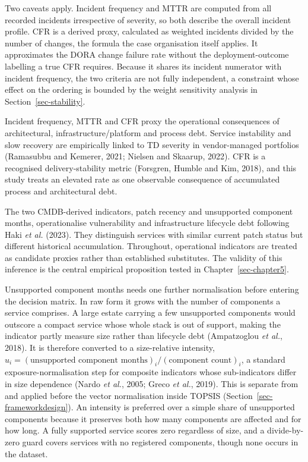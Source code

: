 \documentclass[
  12pt,
  letterpaper,
  12pt,
  oneside,
  english,
  onehalfspacing,
  headsepline]{MastersDoctoralThesis}
\begin{document}
Two caveats apply. Incident frequency and MTTR are computed from all
recorded incidents irrespective of severity, so both describe the
overall incident profile. CFR is a derived proxy, calculated as weighted
incidents divided by the number of changes, the formula the case
organisation itself applies. It approximates the DORA change failure
rate without the deployment-outcome labelling a true CFR requires.
Because it shares its incident numerator with incident frequency, the
two criteria are not fully independent, a constraint whose effect on the
ordering is bounded by the weight sensitivity analysis in
Section~\ref{sec-stability}.

Incident frequency, MTTR and CFR proxy the operational consequences of
architectural, infrastructure/platform and process debt. Service
instability and slow recovery are empirically linked to TD severity in
vendor-managed portfolios (Ramasubbu and Kemerer, 2021; Nielsen and
Skaarup, 2022). CFR is a recognised delivery-stability metric (Forsgren,
Humble and Kim, 2018), and this study treats an elevated rate as one
observable consequence of accumulated process and architectural debt.

The two CMDB-derived indicators, patch recency and unsupported component
months, operationalise vulnerability and infrastructure lifecycle debt
following Haki \emph{et al.} (2023). They distinguish services with
similar current patch status but different historical accumulation.
Throughout, operational indicators are treated as candidate proxies
rather than established substitutes. The validity of this inference is
the central empirical proposition tested in Chapter~\ref{sec-chapter5}.

Unsupported component months needs one further normalisation before
entering the decision matrix. In raw form it grows with the number of
components a service comprises. A large estate carrying a few
unsupported components would outscore a compact service whose whole
stack is out of support, making the indicator partly measure size rather
than lifecycle debt (Ampatzoglou \emph{et al.}, 2018). It is therefore
converted to a size-relative intensity,
\(u_i = (\text{unsupported component months})_i / (\text{component count})_i\),
a standard exposure-normalisation step for composite indicators whose
sub-indicators differ in size dependence (Nardo \emph{et al.}, 2005;
Greco \emph{et al.}, 2019). This is separate from and applied before the
vector normalisation inside TOPSIS (Section~\ref{sec-frameworkdesign}).
An intensity is preferred over a simple share of unsupported components
because it preserves both how many components are affected and for how
long. A fully supported service scores zero regardless of size, and a
divide-by-zero guard covers services with no registered components,
though none occurs in the dataset.
\end{document}
